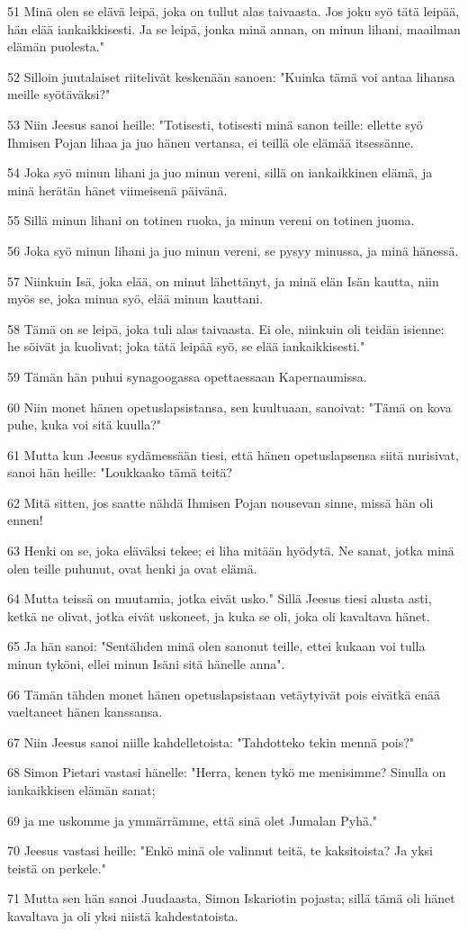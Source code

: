 \par 51 Minä olen se elävä leipä, joka on tullut alas taivaasta. Jos joku syö tätä leipää, hän elää iankaikkisesti. Ja se leipä, jonka minä annan, on minun lihani, maailman elämän puolesta."
\par 52 Silloin juutalaiset riitelivät keskenään sanoen: "Kuinka tämä voi antaa lihansa meille syötäväksi?"
\par 53 Niin Jeesus sanoi heille: "Totisesti, totisesti minä sanon teille: ellette syö Ihmisen Pojan lihaa ja juo hänen vertansa, ei teillä ole elämää itsessänne.
\par 54 Joka syö minun lihani ja juo minun vereni, sillä on iankaikkinen elämä, ja minä herätän hänet viimeisenä päivänä.
\par 55 Sillä minun lihani on totinen ruoka, ja minun vereni on totinen juoma.
\par 56 Joka syö minun lihani ja juo minun vereni, se pysyy minussa, ja minä hänessä.
\par 57 Niinkuin Isä, joka elää, on minut lähettänyt, ja minä elän Isän kautta, niin myös se, joka minua syö, elää minun kauttani.
\par 58 Tämä on se leipä, joka tuli alas taivaasta. Ei ole, niinkuin oli teidän isienne: he söivät ja kuolivat; joka tätä leipää syö, se elää iankaikkisesti."
\par 59 Tämän hän puhui synagoogassa opettaessaan Kapernaumissa.
\par 60 Niin monet hänen opetuslapsistansa, sen kuultuaan, sanoivat: "Tämä on kova puhe, kuka voi sitä kuulla?"
\par 61 Mutta kun Jeesus sydämessään tiesi, että hänen opetuslapsensa siitä nurisivat, sanoi hän heille: "Loukkaako tämä teitä?
\par 62 Mitä sitten, jos saatte nähdä Ihmisen Pojan nousevan sinne, missä hän oli ennen!
\par 63 Henki on se, joka eläväksi tekee; ei liha mitään hyödytä. Ne sanat, jotka minä olen teille puhunut, ovat henki ja ovat elämä.
\par 64 Mutta teissä on muutamia, jotka eivät usko." Sillä Jeesus tiesi alusta asti, ketkä ne olivat, jotka eivät uskoneet, ja kuka se oli, joka oli kavaltava hänet.
\par 65 Ja hän sanoi: "Sentähden minä olen sanonut teille, ettei kukaan voi tulla minun tyköni, ellei minun Isäni sitä hänelle anna".
\par 66 Tämän tähden monet hänen opetuslapsistaan vetäytyivät pois eivätkä enää vaeltaneet hänen kanssansa.
\par 67 Niin Jeesus sanoi niille kahdelletoista: "Tahdotteko tekin mennä pois?"
\par 68 Simon Pietari vastasi hänelle: "Herra, kenen tykö me menisimme? Sinulla on iankaikkisen elämän sanat;
\par 69 ja me uskomme ja ymmärrämme, että sinä olet Jumalan Pyhä."
\par 70 Jeesus vastasi heille: "Enkö minä ole valinnut teitä, te kaksitoista? Ja yksi teistä on perkele."
\par 71 Mutta sen hän sanoi Juudaasta, Simon Iskariotin pojasta; sillä tämä oli hänet kavaltava ja oli yksi niistä kahdestatoista.

